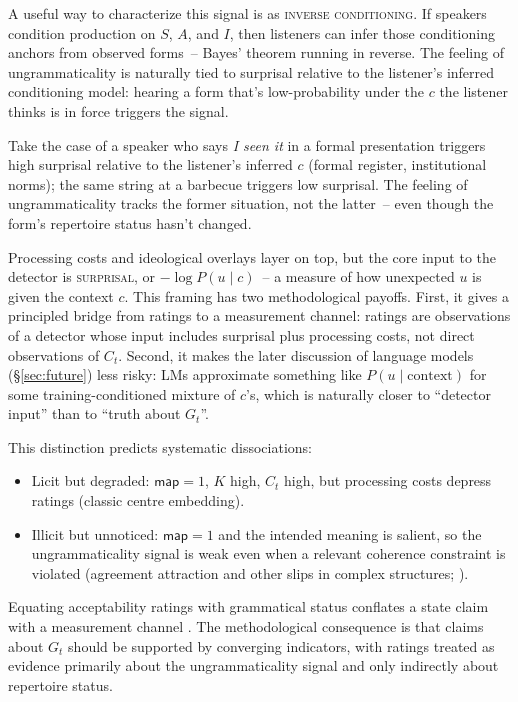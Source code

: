 \documentclass[12pt,letterpaper]{article}
\newcommand{\term}[1]{\textsc{#1}}
\newcommand{\mention}[1]{\textit{#1}}
\begin{document}
A useful way to characterize this signal is as \term{inverse conditioning}. If speakers condition production on $S$, $A$, and $I$, then listeners can infer those conditioning anchors from observed forms~-- Bayes' theorem running in reverse. The feeling of ungrammaticality is naturally tied to surprisal relative to the listener's inferred conditioning model: hearing a form that's low-probability under the $c$ the listener thinks is in force triggers the signal.

Take the case of a speaker who says \mention{I seen it} in a formal presentation triggers high surprisal relative to the listener's inferred $c$ (formal register, institutional norms); the same string at a barbecue triggers low surprisal. The feeling of ungrammaticality tracks the former situation, not the latter~-- even though the form's repertoire status hasn't changed.

Processing costs and ideological overlays layer on top, but the core input to the detector is \term{surprisal}, or $-\log P(u\mid c)$~-- a measure of how unexpected $u$ is given the context $c$. This framing has two methodological payoffs. First, it gives a principled bridge from ratings to a measurement channel: ratings are observations of a detector whose input includes surprisal plus processing costs, not direct observations of $C_t$. Second, it makes the later discussion of language models (\S\ref{sec:future}) less risky: LMs approximate something like $P(u\mid \text{context})$ for some training-conditioned mixture of $c$'s, which is naturally closer to \enquote{detector input} than to \enquote{truth about $G_t$}.

This distinction predicts systematic dissociations:

\begin{itemize}
\item Licit but degraded: $\mathsf{map}=1$, $K$ high, $C_t$ high, but processing costs depress ratings (classic centre embedding).
\item Illicit but unnoticed: $\mathsf{map}=1$ and the intended meaning is salient, so the ungrammaticality signal is weak even when a relevant coherence constraint is violated (agreement attraction and other slips in complex structures; \citealt{wagers2009agreement}).
\end{itemize}

Equating acceptability ratings with grammatical status conflates a state claim with a measurement channel \autocite[ch.~5]{reynolds2025hpcbook}. The methodological consequence is that claims about $G_t$ should be supported by converging indicators, with ratings treated as evidence primarily about the ungrammaticality signal and only indirectly about repertoire status.
\end{document}
